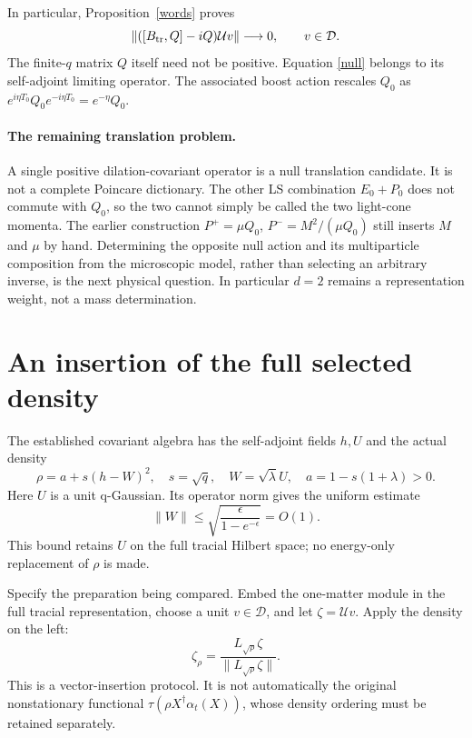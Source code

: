 \documentclass[11pt]{article}
\newcommand{\eps}{\epsilon}
\newcommand{\Bt}{B_{\rm tr}}
\newcommand{\U}{\mathcal U}
\newcommand{\D}{\mathcal D}
\begin{document}
In particular, Proposition~\ref{words} proves
\begin{equation}
 \|([\Bt,Q]-iQ)\U v\|\longrightarrow0,\qquad v\in\D.
\end{equation}
The finite-$q$ matrix $Q$ itself need not be positive.
Equation \eqref{null} belongs to its self-adjoint limiting
operator. The associated boost action rescales $Q_0$ as
$e^{i\eta T_0}Q_0e^{-i\eta T_0}=e^{-\eta}Q_0$.

\paragraph{The remaining translation problem.}
A single positive dilation-covariant operator is a null
translation candidate. It is not a complete Poincare dictionary.
The other LS combination $E_0+P_0$ does not commute with $Q_0$,
so the two cannot simply be called the two light-cone momenta.
The earlier construction $P^+=\mu Q_0$,
$P^-=M^2/(\mu Q_0)$ still inserts $M$ and $\mu$ by hand.
Determining the opposite null action and its multiparticle
composition from the microscopic model, rather than selecting
an arbitrary inverse, is the next physical question. In particular
$d=2$ remains a representation weight, not a mass determination.

\newpage
\section{An insertion of the full selected density}
The established covariant algebra has the self-adjoint fields
$h,U$ and the actual density
\begin{equation}
 \rho=a+s(h-W)^2,\quad
 s=\sqrt q,\quad W=\sqrt\lambda U,\quad
 a=1-s(1+\lambda)>0.\label{rho}
\end{equation}
Here $U$ is a unit q-Gaussian. Its operator norm gives the
uniform estimate
\begin{equation}
 \|W\|\le\sqrt{\frac{\eps}{1-e^{-\eps}}}=O(1).
 \label{Wnorm}
\end{equation}
This bound retains $U$ on the full tracial Hilbert space; no
energy-only replacement of $\rho$ is made.

Specify the preparation being compared. Embed the one-matter
module in the full tracial representation, choose a unit
$v\in\D$, and let $\zeta=\U v$. Apply the density on the left:
\begin{equation}
 \zeta_\rho=\frac{L_{\sqrt\rho}\zeta}
                    {\|L_{\sqrt\rho}\zeta\|}.
 \label{protocol}
\end{equation}
This is a vector-insertion protocol. It is not automatically
the original nonstationary functional
$\tau(\rho X^\dagger\alpha_t(X))$, whose density ordering
must be retained separately.
\end{document}
